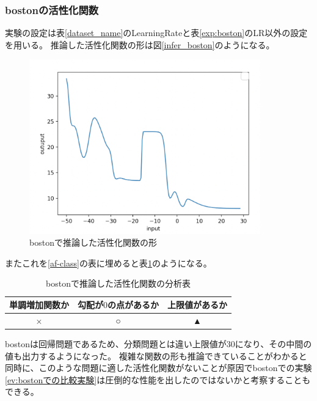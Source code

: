 \subsubsection{bostonの活性化関数}
実験の設定は表\ref{dataset_name}のLearningRateと表\ref{exp:boston}のLR以外の設定を用いる。
推論した活性化関数の形は図\ref{infer_boston}のようになる。
\begin{figure}[hbtp]
    \begin{center}
        \includegraphics[width=10cm]{asset/boston-0.00001.png}
            \caption{bostonで推論した活性化関数の形}
            \label{ifer_boston}
    \end{center}
\end{figure}

またこれを\ref{af-class}の表に埋めると表\ref{anal_boston}のようになる。
\begin{table}[htbp]
    \begin{center}
        \caption{bostonで推論した活性化関数の分析表}
        \label{anal_boston}
        \vspace{2mm} 
        \begin{tabular}{ |c|c|c| }
        単調増加関数か & 勾配が$ 0 $の点があるか & 上限値があるか   \\
        \hline
        × & ○ & ▲   \\
        \end{tabular}
    \end{center}
\end{table}


bostonは回帰問題であるため、分類問題とは違い上限値が30になり、その中間の値も出力するようになった。
複雑な関数の形も推論できていることがわかると同時に、このような問題に適した活性化関数がないことが原因でbostonでの実験\ref{ev:bostonでの比較実験}は圧倒的な性能を出したのではないかと考察することもできる。






